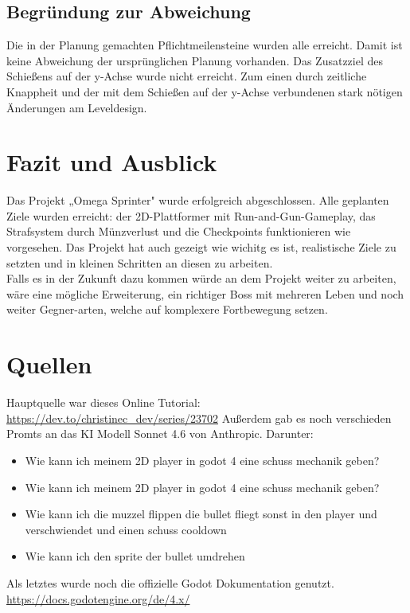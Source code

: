 \documentclass{article}
\begin{document}
\subsection{Begründung zur Abweichung}
Die in der Planung gemachten Pflichtmeilensteine wurden alle erreicht. Damit ist keine Abweichung der ursprünglichen Planung vorhanden. Das Zusatzziel des Schießens auf der y-Achse wurde nicht erreicht. Zum einen durch zeitliche Knappheit und der mit dem Schießen auf der y-Achse verbundenen stark nötigen Änderungen am Leveldesign.

\newpage

\section{Fazit und Ausblick}

Das Projekt „Omega Sprinter" wurde erfolgreich abgeschlossen. Alle geplanten Ziele wurden erreicht: der 2D-Plattformer mit Run-and-Gun-Gameplay, das Strafsystem durch Münzverlust und die Checkpoints funktionieren wie vorgesehen.
Das Projekt hat auch gezeigt wie wichitg es ist, realistische Ziele zu setzten und in kleinen Schritten an diesen zu arbeiten.\\
Falls es in der Zukunft dazu kommen würde an dem Projekt weiter zu arbeiten, wäre eine mögliche Erweiterung, ein richtiger Boss mit mehreren Leben und noch weiter Gegner-arten, welche auf komplexere Fortbewegung setzen. 

\section{Quellen}
Hauptquelle war dieses Online Tutorial:\\
\url{https://dev.to/christinec_dev/series/23702}
Außerdem gab es noch verschieden Promts an das KI Modell Sonnet 4.6 von Anthropic. Darunter:\\
\vspace{-5mm}
\begin{itemize}
	\item Wie kann ich meinem 2D player in godot 4 eine schuss mechanik geben?
	\item Wie kann ich meinem 2D player in godot 4 eine schuss mechanik geben?
	\item Wie kann ich die muzzel flippen die bullet fliegt sonst in den player und verschwiendet und einen schuss cooldown
	\item Wie kann ich den sprite der bullet umdrehen
\end{itemize}
Als letztes wurde noch die offizielle Godot Dokumentation genutzt.\\
\url{https://docs.godotengine.org/de/4.x/}
\end{document}
